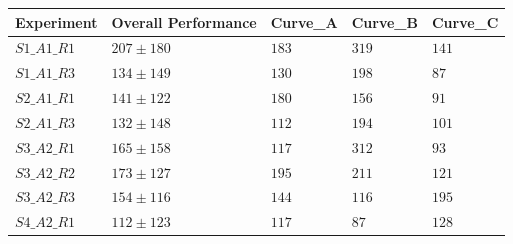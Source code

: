\begin{table}[H]
\centering
\begin{tabular}{|l|l|l|l|l|}
\hline
\multicolumn{1}{|c|}{\textbf{Experiment}} & \multicolumn{1}{c|}{\textbf{Overall Performance}} & \multicolumn{1}{c|}{\textbf{Curve\_A}} & \multicolumn{1}{c|}{\textbf{Curve\_B}} & \multicolumn{1}{c|}{\textbf{Curve\_C}} \\ \hline
$S1\_A1\_R1$                              & $207 \pm 180$                                     & $183$                                  & $319$                                  & $141$                                  \\ \hline
$S1\_A1\_R3$                              & $134 \pm 149$                                     & $130$                                  & $198$                                  & $87$                                   \\ \hline
$S2\_A1\_R1$                              & $141 \pm 122$                                     & $180$                                  & $156$                                  & $91$                                   \\ \hline
$S2\_A1\_R3$                              & $132 \pm 148$                                     & $112$                                  & $194$                                  & $101$                                  \\ \hline
$S3\_A2\_R1$                              & $165 \pm 158$                                     & $117$                                  & $312$                                  & $93$                                   \\ \hline
$S3\_A2\_R2$                              & $173 \pm 127$                                     & $195$                                  & $211$                                  & $121$                                  \\ \hline
$S3\_A2\_R3$                              & $154 \pm 116$                                     & $144$                                  & $116$                                  & $195$                                  \\ \hline
$S4\_A2\_R1$                              & $112 \pm 123$                                     & $117$                                  & $87$                                   & $128$                                  \\ \hline

\end{tabular}
\end{table}
